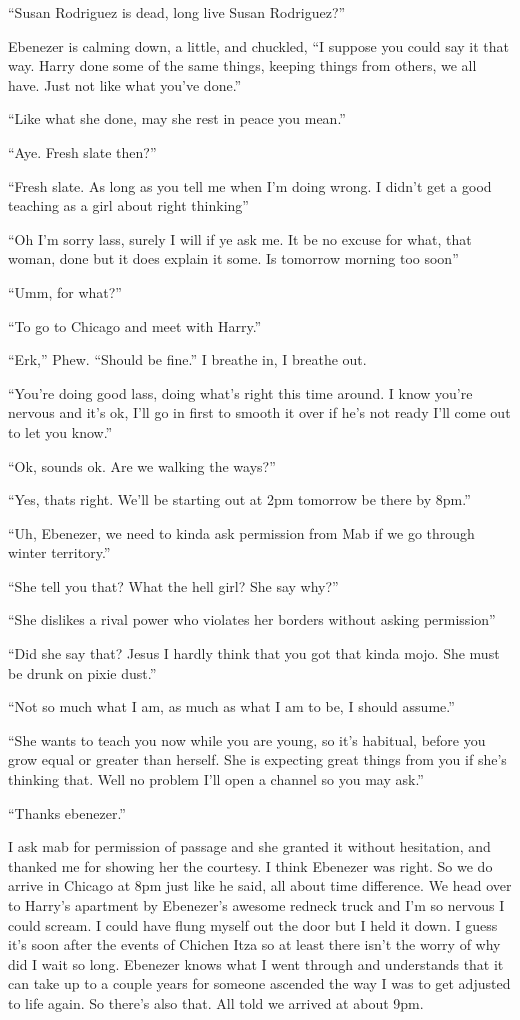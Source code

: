 ``Susan Rodriguez is dead, long live Susan Rodriguez?''

Ebenezer is calming down, a little, and chuckled, ``I suppose you could say it that way. Harry done some of the same things, keeping things from others, we all have. Just not like what you've done.''

``Like what she done, may she rest in peace you mean.''

``Aye. Fresh slate then?''

``Fresh slate. As long as you tell me when I'm doing wrong. I didn't get a good teaching as a girl about right thinking''

``Oh I'm sorry lass, surely I will if ye ask me. It be no excuse for what, that woman, done but it does explain it some. Is tomorrow morning too soon''

``Umm, for what?''

``To go to Chicago and meet with Harry.''

``Erk,'' Phew. ``Should be fine.'' I breathe in, I breathe out.

``You're doing good lass, doing what's right this time around. I know you're nervous and it's ok, I'll go in first to smooth it over if he's not ready I'll come out to let you know.''

``Ok, sounds ok. Are we walking the ways?''

``Yes, thats right. We'll be starting out at 2pm tomorrow be there by 8pm.''

``Uh, Ebenezer, we need to kinda ask permission from Mab if we go through winter territory.''

``She tell you that? What the hell girl? She say why?''

``She dislikes a rival power who violates her borders without asking permission''

``Did she say that? Jesus I hardly think that you got that kinda mojo. She must be drunk on pixie dust.''

``Not so much what I am, as much as what I am to be, I should assume.''

``She wants to teach you now while you are young, so it's habitual, before you grow equal or greater than herself. She is expecting great things from you if she's thinking that. Well no problem I'll open a channel so you may ask.''

``Thanks ebenezer.''

I ask mab for permission of passage and she granted it without hesitation, and thanked me for showing her the courtesy. I think Ebenezer was right. So we do arrive in Chicago at 8pm just like he said, all about time difference. We head over to Harry's apartment by Ebenezer's awesome redneck truck and I'm so nervous I could scream. I could have flung myself out the door but I held it down. I guess it's soon after the events of Chichen Itza so at least there isn't the worry of why did I wait so long. Ebenezer knows what I went through and understands that it can take up to a couple years for someone ascended the way I was to get adjusted to life again. So there's also that. All told we arrived at about 9pm.

